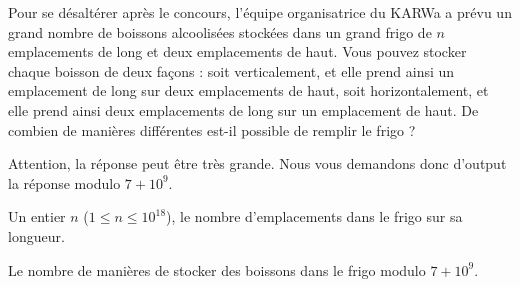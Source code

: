 \problemname{\problemyamlname}


Pour se désaltérer après le concours, l'équipe organisatrice du KARWa a prévu un grand
nombre de boissons alcoolisées stockées dans un grand frigo de $n$ emplacements
de long et deux emplacements de haut. Vous pouvez stocker chaque boisson de
deux façons : soit verticalement, et elle prend ainsi un emplacement de long sur
deux emplacements de haut, soit horizontalement, et elle prend ainsi deux
emplacements de long sur un emplacement de haut. De combien de manières
différentes est-il possible de remplir le frigo ?

Attention, la réponse peut être très grande. Nous vous demandons donc d'output
la réponse modulo $7+10^9$.

\begin{Input}
	Un entier $n$ ($1 \le n \le 10^{18}$), le nombre d'emplacements dans le frigo sur sa longueur.
\end{Input}

\begin{Output}
	Le nombre de manières de stocker des boissons dans le frigo modulo $7+10^9$.
\end{Output}
